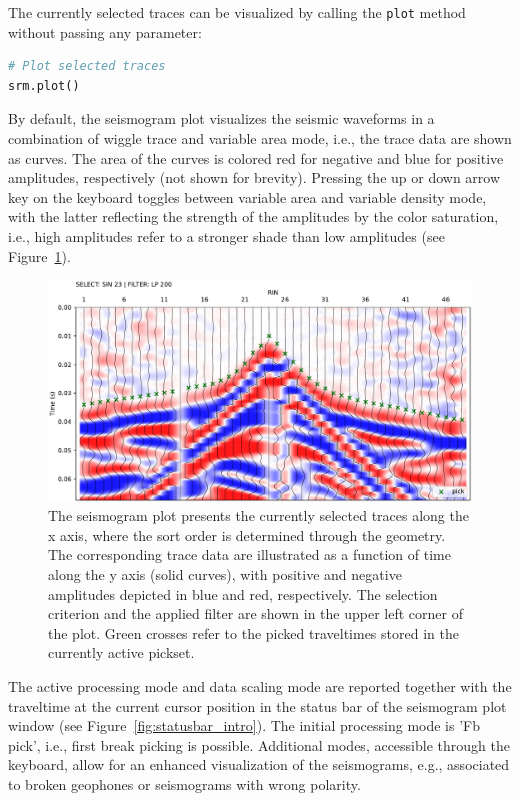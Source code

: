 \documentclass[a4paper,fleqn]{cas-sc}
\begin{document}
The currently selected traces can be visualized by calling the \texttt{plot} method without passing any parameter:
\begin{lstlisting}[language=Python, firstnumber=18]
# Plot selected traces
srm.plot()
\end{lstlisting}
By default, the seismogram plot visualizes the seismic waveforms in a combination of wiggle trace and variable area mode, i.e., the trace data are shown as curves. The area of the curves is colored red for negative and blue for positive amplitudes, respectively (not shown for brevity). Pressing the up or down arrow key on the keyboard toggles between variable area and variable density mode, with the latter reflecting the strength of the amplitudes by the color saturation, i.e., high amplitudes refer to a stronger shade than low amplitudes (see Figure~\ref{fig:srm_intro}).
\begin{figure}
	\centering
	\includegraphics[width=.75\textwidth]{figures/srm_intro.pdf}
	\caption{The seismogram plot presents the currently selected traces along the x axis, where the sort order is determined through the geometry. The corresponding trace data are illustrated as a function of time along the y axis (solid curves), with positive and negative amplitudes depicted in blue and red, respectively. The selection criterion and the applied filter are shown in the upper left corner of the plot. Green crosses refer to the picked traveltimes stored in the currently active pickset.}
	\label{fig:srm_intro}
\end{figure}
The active processing mode and data scaling mode are reported together with the traveltime at the current cursor position in the status bar of the seismogram plot window (see Figure~\ref{fig:statusbar_intro}).
The initial processing mode is 'Fb pick', i.e., first break picking is possible. Additional modes, accessible through the keyboard, allow for an enhanced visualization of the seismograms, e.g., associated to broken geophones or seismograms with wrong polarity. 
\end{document}
